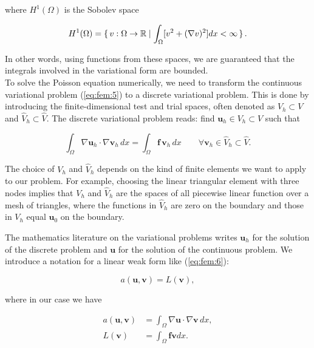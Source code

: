 \documentclass[a4paper,11pt,openright,twoside]{book}
\begin{document}
where $H^1(\Omega)$ is the Sobolev space

\begin{equation}
H^1(\Omega) = \set {v: \Omega \rightarrow \mathbb{R}  | \int_\Omega [v^2 + (\nabla v)^2]dx < \infty }. 
\end{equation}

In other words, using functions from these spaces, we are guaranteed that the integrals involved in the variational form are bounded. \\

To solve the Poisson equation numerically, we need to transform the continuous variational problem (\ref{eq:fem:5}) to a discrete variational problem. This is done by introducing the finite-dimensional test and trial spaces, often denoted as $V_h \subset V$ and $\hat{V}_h \subset \hat{V}$. The discrete variational problem reads: find $\mathbf{u}_h \in V_h \subset V$ such that 

\begin{equation}
\label{eq:fem:6}
\int_\Omega \nabla \mathbf{u}_h \cdot \nabla \mathbf{v}_h \, dx = \int_\Omega \mathbf{f} \, \mathbf{v}_h \, dx \qquad \forall \mathbf{v}_h \in \hat{V}_h \subset \hat{V}.
\end{equation}

The choice of $V_h$ and $\hat{V}_h$ depends on the kind of finite elements we want to apply to our problem. For example, choosing the linear triangular element with three nodes implies that $V_h$ and $\hat{V}_h$ are the spaces of all piecewise linear function over a mesh of triangles, where the functions in $\hat{V}_h$ are zero on the boundary and those in $V_h$ equal $\mathbf{u}_0$ on the boundary.

The mathematics literature on the variational problems writes $\mathbf{u}_h$ for the solution of the discrete problem and $\mathbf{u}$ for the solution of the continuous problem. We introduce a notation for a linear weak form like (\ref{eq:fem:6}):

\begin{equation}
a(\mathbf{u}, \mathbf{v}) = L(\mathbf{v}),
\end{equation}

where in our case we have

\begin{align}
a(\mathbf{u}, \mathbf{v}) &= \int_\Omega \nabla \mathbf{u} \cdot \nabla \mathbf{v} \, dx, \\ 
L(\mathbf{v}) &= \int_\Omega \mathbf{f} \mathbf{v} dx.
\end{align}
\end{document}
